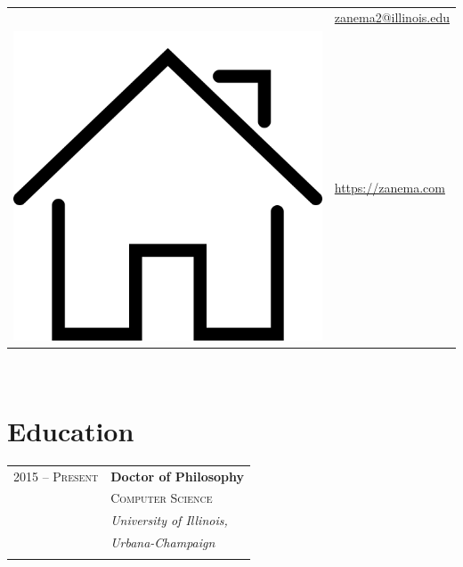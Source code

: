 \documentclass[10pt]{article} %
\makeatletter
\newlength{\mytextsize}
\newcommand{\Homeicon}[0]{\setlength{\mytextsize}{\f@size pt}\includegraphics[height=\mytextsize]{images/home.png} }
\newcommand{\Lettericon}{\raisebox{0.5\depth}{\Letter}}
\makeatother
\begin{document}
\color{text1} %


\par{\\ %

\begin{minipage}[t]{0.44\textwidth} %
\vspace{0pt} %


\colorbox{shade}{\textcolor{text1}{
\begin{tabular}{c|p{7cm}}
\raisebox{-1pt}{\Lettericon} & \href{mailto:zanema2@illinois.edu}{zanema2@illinois.edu} \\ %
\Homeicon & \href{https://zanema.com}{https://zanema.com} \\ %
\end{tabular}
}
}\\[10pt]


\section{Education} 

\begin{tabular}{rl} %


2015 -- \textsc{Present} & \textbf{Doctor of Philosophy} \\ 
& \textsc{Computer Science} \\ 
& \textit{University of Illinois,}\\
& \textit{Urbana-Champaign}\\
&\\
	 

\end{tabular}
\end{minipage}}
\end{document}
